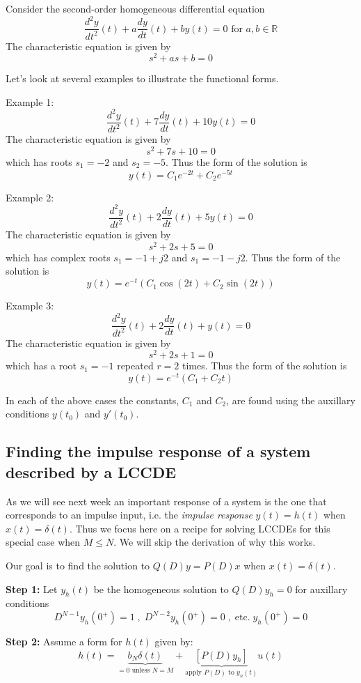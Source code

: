 Consider the second-order homogeneous differential equation
\[
\frac{d^2y}{dt^2}(t) + a\frac{dy}{dt}(t) + by(t) = 0 \mbox{ for } a,b \in \mathbb{R}
\]
The characteristic equation is given by
\[
s^2 + as + b = 0
\]

Let's look at several examples to illustrate the functional forms.

Example 1:
\[
\frac{d^2y}{dt^2}(t) + 7\frac{dy}{dt}(t) + 10y(t) = 0 
\]
The characteristic equation is given by
\[
s^2 + 7s + 10 = 0
\]
which has roots $s_1 = -2$ and $s_2 = -5$. Thus the form of the solution is
\[
y(t) = C_1e^{-2t} + C_2e^{-5t}
\]

Example 2:
\[
\frac{d^2y}{dt^2}(t) + 2\frac{dy}{dt}(t) + 5y(t) = 0 
\]
The characteristic equation is given by
\[
s^2 + 2s + 5 = 0
\]
which has complex roots $s_1 = -1+j2$ and $s_1 = -1-j2$. Thus the form of the solution is
\[
y(t) = e^{-t}\left(C_1\cos(2t) + C_2\sin(2t)\right)
\]

Example 3:
\[
\frac{d^2y}{dt^2}(t) + 2\frac{dy}{dt}(t) + y(t) = 0 
\]
The characteristic equation is given by
\[
s^2 + 2s + 1 = 0
\]
which has a root $s_1 = -1$ repeated $r=2$ times. Thus the form of the solution is
\[
y(t) = e^{-t}\left(C_1 + C_2t\right)
\]

In each of the above cases the constants, $C_1$ and $C_2$, are found using the auxillary conditions $y(t_0)$ and $y\prime(t_0)$.

\subsection{Finding the impulse response of a system described by a LCCDE}

As we will see next week an important response of a system is the one that corresponds to an impulse input, i.e. the \emph{impulse response} $y(t) = h(t)$ when $x(t) = \delta(t)$. Thus we focus here on a recipe for solving LCCDEs for this special case when $M \leq N$. We will skip the derivation of why this works.

Our goal is to find the solution to $Q(D)y = P(D)x$ when $x(t)=\delta(t)$.

\textbf{Step 1:} Let $y_h(t)$ be the homogeneous solution to $Q(D)y_h = 0$ for auxillary conditions
  \[
    D^{N-1}y_h(0^+) = 1 \; , \; D^{N-2}y_h(0^+) = 0 \; , \; \text{etc.} \; y_h(0^+) = 0 
    \]
    
\textbf{Step 2:} Assume a form for $h(t)$ given by:
  \[
  h(t) = \underbrace{b_N\delta(t)}_{=0 \text{ unless } N=M} + \underbrace{\left[ P(D)y_h\right]}_{\text{apply } P(D) \text{ to } y_n(t)}u(t)
  \]


